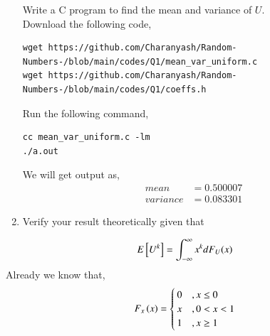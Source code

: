 \documentclass[journal,12pt,twocolumn]{IEEEtran}
\renewcommand\thesection{\arabic{section}}
\begin{document}
\begin{enumerate}[label=\thesection.\arabic*,ref=\thesection.\theenumi]
Write a C program to  find the mean and variance of $U$.\\ 
\solution Download the following code,
 \begin{lstlisting}
wget https://github.com/Charanyash/Random-Numbers-/blob/main/codes/Q1/mean_var_uniform.c
wget https://github.com/Charanyash/Random-Numbers-/blob/main/codes/Q1/coeffs.h
 \end{lstlisting}
Run the following command,
 \begin{lstlisting}
cc mean_var_uniform.c -lm
./a.out
 \end{lstlisting}
We will get output as,
\begin{align}
	mean &= 0.500007\\
  variance&= 0.083301
\end{align}
	
\item Verify your result theoretically given that
\end{enumerate}
%
\begin{equation}
E{}\left[U^k\right] = \int_{-\infty}^{\infty}x^kdF_{U}(x)
\end{equation}
\solution Already we know that,
                \begin{equation*}
                                 F_{x}\left(x\right) = \begin{cases}
                                                          0  &, x \leq 0 \\
                                                          x  &, 0<x<1 \\
                                                          1  & , x \geq 1
                                                        \end{cases}
                 \end{equation*}
\end{document}
